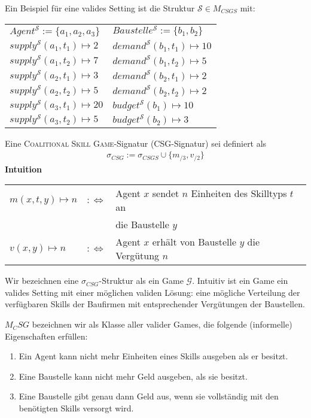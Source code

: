 \begin{bsp}[]
  Ein Beispiel für eine valides Setting ist die Struktur $\mathcal{S}\in M_{CSGS}$ mit:\\

  \setlength{\tabcolsep}{24pt}
  \begin{tabular}{l|l}
    $Agent^\mathcal{S} := \{a_1, a_2, a_3\}$ & $Baustelle^\mathcal{S} := \{b_1, b_2\}$ \\
    $supply^\mathcal{S}(a_1, t_1)\mapsto 2 $ & $demand^\mathcal{S}(b_1, t_1)\mapsto 10$\\
    $supply^\mathcal{S}(a_1, t_2)\mapsto 7 $ & $demand^\mathcal{S}(b_1, t_2)\mapsto 5 $\\
    $supply^\mathcal{S}(a_2, t_1)\mapsto 3 $ & $demand^\mathcal{S}(b_2, t_1)\mapsto 2 $\\
    $supply^\mathcal{S}(a_2, t_2)\mapsto 5 $ & $demand^\mathcal{S}(b_2, t_2)\mapsto 2 $\\
    $supply^\mathcal{S}(a_3, t_1)\mapsto 20$ & $budget^\mathcal{S}(b_1)\mapsto 10$\\
    $supply^\mathcal{S}(a_3, t_2)\mapsto 5 $ & $budget^\mathcal{S}(b_2)\mapsto 3 $\\
  \end{tabular}
\end{bsp}

\begin{definition}[CSG]
  Eine \textsc{Coalitional Skill Game}-Signatur (CSG-Signatur) sei definiert als
  \begin{align*}
    \sigma_{CSG}:=\sigma_{CSGS}\cup\{m_{/3}, v_{/2}\}
  \end{align*}
  \textbf{Intuition} \\
    \begin{tabular}{lrl}
    $m(x, t, y)\mapsto n$&$:\Leftrightarrow$& Agent $x$ sendet $n$ Einheiten des Skilltyps $t$ an \\&&die Baustelle $y$ \\
    $v(x,y)\mapsto n$&$:\Leftrightarrow$& Agent $x$ erhält von Baustelle $y$ die Vergütung $n$
    \end{tabular}
\end{definition}

Wir bezeichnen eine $\sigma_{CSG}$-Struktur als ein Game $\mathcal{G}$. Intuitiv ist ein Game ein valides Setting mit einer möglichen validen Lösung: eine mögliche Verteilung der verfügbaren Skills der Baufirmen mit entsprechender Vergütungen der Baustellen.

$M_CSG$ bezeichnen wir als Klasse aller valider Games, die folgende (informelle) Eigenschaften erfüllen:
\begin{enumerate}
  \item Ein Agent kann nicht mehr Einheiten eines Skills ausgeben als er besitzt.
  \item Eine Baustelle kann nicht mehr Geld ausgeben, als sie besitzt.
  \item Eine Baustelle gibt genau dann Geld aus, wenn sie vollständig mit den benötigten Skills versorgt wird.
\end{enumerate}


